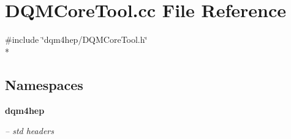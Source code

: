 \section{D\+Q\+M\+Core\+Tool.\+cc File Reference}
\label{DQMCoreTool_8cc}
{\ttfamily \#include \char`\"{}dqm4hep/\+D\+Q\+M\+Core\+Tool.\+h\char`\"{}}\\*
\subsection*{Namespaces}
\begin{DoxyCompactItemize}
\item 
 {\bf dqm4hep}
\begin{DoxyCompactList}\small\item\em -- std headers \end{DoxyCompactList}\end{DoxyCompactItemize}
